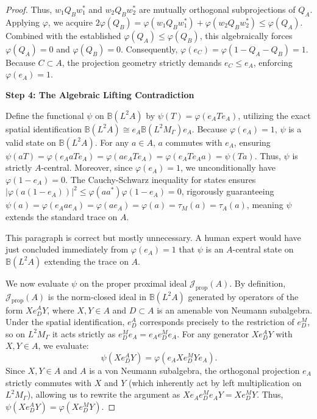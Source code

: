 \documentclass[12pt]{article}
\newcommand{\review}[1]{\begin{reviewbox}#1\end{reviewbox}}
\begin{document}
\begin{proof}
Thus, $w_1 Q_B w_1^*$ and $w_2 Q_B w_2^*$ are mutually orthogonal subprojections of $Q_A$. 
Applying $\varphi$, we acquire $2 \varphi(Q_B) = \varphi(w_1 Q_B w_1^*) + \varphi(w_2 Q_B w_2^*) \le \varphi(Q_A)$. Combined with the established $\varphi(Q_A) \le \varphi(Q_B)$, this algebraically forces $\varphi(Q_A) = 0$ and $\varphi(Q_B) = 0$. 
Consequently, $\varphi(e_C) = \varphi(1 - Q_A - Q_B) = 1$. Because $C \subset A$, the projection geometry strictly demands $e_C \le e_A$, enforcing $\varphi(e_A) = 1$.

\medskip\noindent\textbf{Step 4: The Algebraic Lifting Contradiction}

Define the functional $\psi$ on $\mathbb{B}(L^2A)$ by $\psi(T) = \varphi(e_A T e_A)$, utilizing the exact spatial identification $\mathbb{B}(L^2A) \cong e_A \mathbb{B}(L^2M_\Gamma) e_A$. 
Because $\varphi(e_A) = 1$, $\psi$ is a valid state on $\mathbb{B}(L^2A)$. For any $a \in A$, $a$ commutes with $e_A$, ensuring $\psi(a T) = \varphi(e_A a T e_A) = \varphi(a e_A T e_A) = \varphi(e_A T e_A a) = \psi(T a)$. Thus, $\psi$ is strictly $A$-central. Moreover, since $\varphi(e_A) = 1$, we unconditionally have $\varphi(1 - e_A) = 0$. The Cauchy-Schwarz inequality for states ensures $|\varphi(a (1 - e_A))|^2 \le \varphi(a a^*) \varphi(1 - e_A) = 0$, rigorously guaranteeing $\psi(a) = \varphi(e_A a e_A) = \varphi(a e_A) = \varphi(a) = \tau_M(a) = \tau_A(a)$, meaning $\psi$ extends the standard trace on $A$. 

\review{This paragraph is correct but mostly unnecessary. A human expert would have just concluded immediately from $\varphi(e_A) = 1$ that $\psi$ is an $A$-central state on $\mathbb{B}(L^2A)$ extending the trace on $A$.}

We now evaluate $\psi$ on the proper proximal ideal $\mathcal{J}_{\mathrm{prop}}(A)$. By definition, $\mathcal{J}_{\mathrm{prop}}(A)$ is the norm-closed ideal in $\mathbb{B}(L^2A)$ generated by operators of the form $X e_D^A Y$, where $X, Y \in A$ and $D \subset A$ is an amenable von Neumann subalgebra. Under the spatial identification, $e_D^A$ corresponds precisely to the restriction of $e_D^M$, so on $L^2M_\Gamma$ it acts strictly as $e_D^M e_A = e_A e_D^M e_A$. 
For any generator $X e_D^A Y$ with $X, Y \in A$, we evaluate:
\[
\psi(X e_D^A Y) = \varphi(e_A X e_D^M Y e_A).
\]
Since $X, Y \in A$ and $A$ is a von Neumann subalgebra, the orthogonal projection $e_A$ strictly commutes with $X$ and $Y$ (which inherently act by left multiplication on $L^2M_\Gamma$), allowing us to rewrite the argument as $X e_A e_D^M e_A Y = X e_D^M Y$. 
Thus, $\psi(X e_D^A Y) = \varphi(X e_D^M Y)$.


\end{proof}
\end{document}
